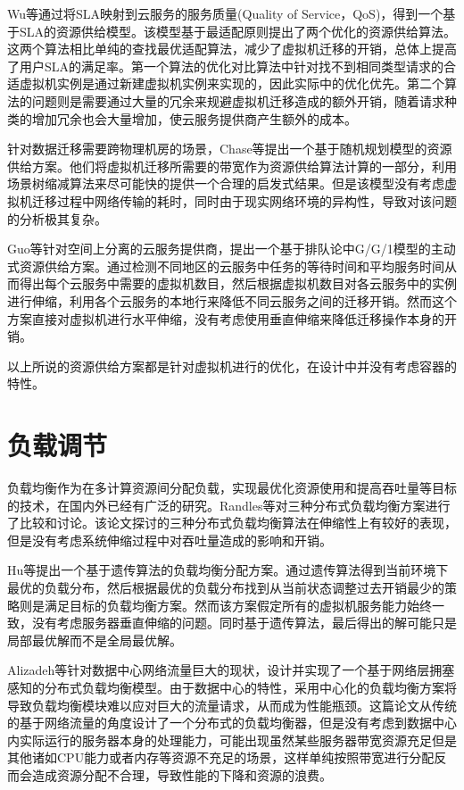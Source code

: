Wu等通过将SLA映射到云服务的服务质量(Quality of Service，QoS)，得到一个基于SLA的资源供给模型\cite{wu2014sla}。该模型基于最适配原则提出了两个优化的资源供给算法。这两个算法相比单纯的查找最优适配算法，减少了虚拟机迁移的开销，总体上提高了用户SLA的满足率。第一个算法的优化对比算法中针对找不到相同类型请求的合适虚拟机实例是通过新建虚拟机实例来实现的，因此实际中的优化优先。第二个算法的问题则是需要通过大量的冗余来规避虚拟机迁移造成的额外开销，随着请求种类的增加冗余也会大量增加，使云服务提供商产生额外的成本。

针对数据迁移需要跨物理机房的场景，Chase等提出一个基于随机规划模型的资源供给方案\cite{chase2017joint}。他们将虚拟机迁移所需要的带宽作为资源供给算法计算的一部分，利用场景树缩减算法来尽可能快的提供一个合理的启发式结果。但是该模型没有考虑虚拟机迁移过程中网络传输的耗时，同时由于现实网络环境的异构性，导致对该问题的分析极其复杂。

Guo等针对空间上分离的云服务提供商，提出一个基于排队论中G/G/1模型的主动式资源供给方案\cite{guo2016geoscale}。通过检测不同地区的云服务中任务的等待时间和平均服务时间从而得出每个云服务中需要的虚拟机数目，然后根据虚拟机数目对各云服务中的实例进行伸缩，利用各个云服务的本地行来降低不同云服务之间的迁移开销。然而这个方案直接对虚拟机进行水平伸缩，没有考虑使用垂直伸缩来降低迁移操作本身的开销。

以上所说的资源供给方案都是针对虚拟机进行的优化，在设计中并没有考虑容器的特性。

\section{负载调节}
负载均衡作为在多计算资源间分配负载，实现最优化资源使用和提高吞吐量等目标的技术，在国内外已经有广泛的研究。Randles等对三种分布式负载均衡方案进行了比较和讨论\cite{randles2010comparative}。该论文探讨的三种分布式负载均衡算法在伸缩性上有较好的表现，但是没有考虑系统伸缩过程中对吞吐量造成的影响和开销。

Hu等提出一个基于遗传算法的负载均衡分配方案\cite{hu2010scheduling}。通过遗传算法得到当前环境下最优的负载分布，然后根据最优的负载分布找到从当前状态调整过去开销最少的策略则是满足目标的负载均衡方案。然而该方案假定所有的虚拟机服务能力始终一致，没有考虑服务器垂直伸缩的问题。同时基于遗传算法，最后得出的解可能只是局部最优解而不是全局最优解。

Alizadeh等针对数据中心网络流量巨大的现状，设计并实现了一个基于网络层拥塞感知的分布式负载均衡模型\cite{alizadeh2014conga}。由于数据中心的特性，采用中心化的负载均衡方案将导致负载均衡模块难以应对巨大的流量请求，从而成为性能瓶颈。这篇论文从传统的基于网络流量的角度设计了一个分布式的负载均衡器，但是没有考虑到数据中心内实际运行的服务器本身的处理能力，可能出现虽然某些服务器带宽资源充足但是其他诸如CPU能力或者内存等资源不充足的场景，这样单纯按照带宽进行分配反而会造成资源分配不合理，导致性能的下降和资源的浪费。

